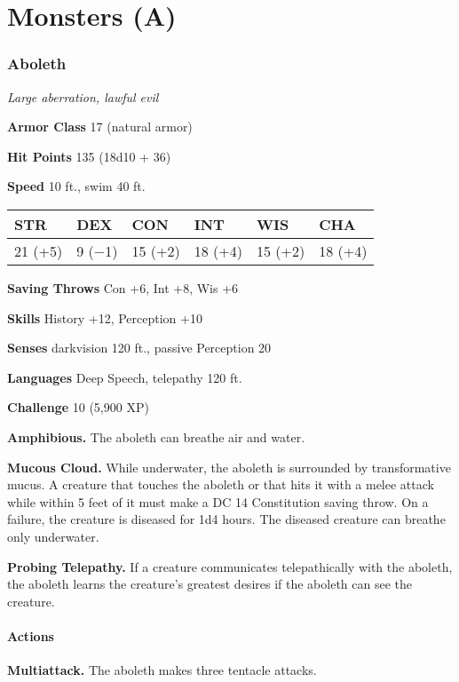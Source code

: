\documentclass[
]{article}
\date{}
\begin{document}
\hypertarget{monsters-a}{%
\section{Monsters (A)}\label{monsters-a}}

\hypertarget{aboleth}{%
\subsubsection{Aboleth}\label{aboleth}}

\emph{Large aberration, lawful evil}

\textbf{Armor Class} 17 (natural armor)

\textbf{Hit Points} 135 (18d10 + 36)

\textbf{Speed} 10 ft., swim 40 ft.

\begin{longtable}[]{@{}llllll@{}}
\toprule
STR & DEX & CON & INT & WIS & CHA\tabularnewline
\midrule
\endhead
21 (+5) & 9 (−1) & 15 (+2) & 18 (+4) & 15 (+2) & 18 (+4)\tabularnewline
\bottomrule
\end{longtable}

\textbf{Saving Throws} Con +6, Int +8, Wis +6

\textbf{Skills} History +12, Perception +10

\textbf{Senses} darkvision 120 ft., passive Perception 20

\textbf{Languages} Deep Speech, telepathy 120 ft.

\textbf{Challenge} 10 (5,900 XP)

\textbf{Amphibious.} The aboleth can breathe air and water.

\textbf{Mucous Cloud.} While underwater, the aboleth is surrounded by
transformative mucus. A creature that touches the aboleth or that hits
it with a melee attack while within 5 feet of it must make a DC 14
Constitution saving throw. On a failure, the creature is diseased for
1d4 hours. The diseased creature can breathe only underwater.

\textbf{Probing Telepathy.} If a creature communicates telepathically
with the aboleth, the aboleth learns the creature's greatest desires if
the aboleth can see the creature.

\hypertarget{actions}{%
\paragraph{Actions}\label{actions}}

\textbf{Multiattack.} The aboleth makes three tentacle attacks.
\end{document}

